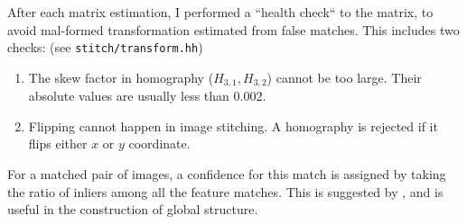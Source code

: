 After each matrix estimation, I performed
a ``health check`` to the matrix,
to avoid mal-formed transformation
estimated from false matches.
This includes two checks: (see \verb|stitch/transform.hh|)
\begin{enumerate}

  \item  The skew factor in homography
    ($ H_{3,1},H_{3,2}$) cannot be too large. Their
    absolute values are usually less than 0.002.

  \item Flipping cannot happen in image stitching.
    A homography is rejected if it flips either $x$
    or $y$ coordinate.
\end{enumerate}

For a matched pair of images,
a confidence for this match
is assigned by taking the ratio of inliers
among all the feature matches. This is
suggested by \cite{panoramic-sift}, and is useful
in the construction of global structure.
